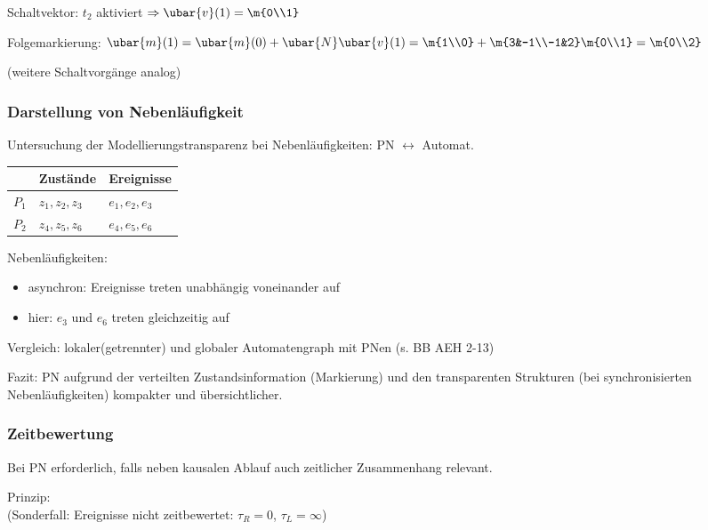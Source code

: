 Schaltvektor: $t_2$ aktiviert $\Rightarrow \ubar{v}(1)=\m{0\\1}$

Folgemarkierung: $\ubar{m}(1)=\ubar{m}(0) + \ubar{N} \ubar{v}(1) = \m{1\\0}+\m{3&-1\\-1&2} \m{0\\1} = \m{0\\2}$

(weitere Schaltvorgänge analog)

\subsubsection{Darstellung von Nebenläufigkeit}
Untersuchung der Modellierungstransparenz bei Nebenläufigkeiten: PN $\leftrightarrow$ Automat.


\begin{tabular}{l|l|l}
	 & Zustände & Ereignisse \\
	 \hline
	 $P_1$ & $z_1,z_2,z_3$ & $e_1,e_2,e_3$ \\
	 \hline
	 $P_2$ & $z_4,z_5,z_6$ & $e_4,e_5,e_6$ 
\end{tabular}

Nebenläufigkeiten: 
\begin{itemize}
	\item asynchron: Ereignisse treten unabhängig voneinander auf
	\item hier: $e_3$ und $e_6$ treten gleichzeitig auf
\end{itemize}

Vergleich: lokaler(getrennter) und globaler Automatengraph mit PNen (s. BB AEH 2-13)

Fazit: PN aufgrund der verteilten Zustandsinformation (Markierung) und den transparenten Strukturen (bei synchronisierten Nebenläufigkeiten) kompakter und übersichtlicher.

\subsubsection{Zeitbewertung}
Bei PN erforderlich, falls neben kausalen Ablauf auch zeitlicher Zusammenhang relevant. 

Prinzip: \\
(Sonderfall: Ereignisse nicht zeitbewertet: $\tau_R=0$, $\tau_L=\infty$)


